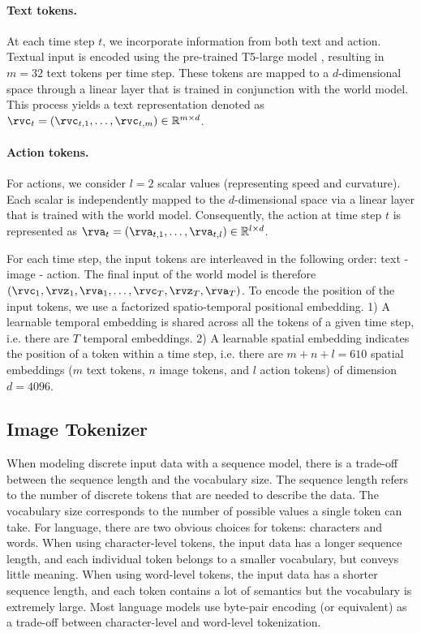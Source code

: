 \paragraph{Text tokens.} At each time step $t$, we incorporate information from both text and action. Textual input is encoded using the pre-trained T5-large model \citep{2020t5}, resulting in $m=32$ text tokens per time step. These tokens are mapped to a $d$-dimensional space through a linear layer that is trained in conjunction with the world model. This process yields a text representation denoted as $\rvc_t = (\rvc_{t,1}, \ldots, \rvc_{t,m}) \in \mathbb{R}^{m\times d}$.

\paragraph{Action tokens.} For actions, we consider $l=2$ scalar values (representing speed and curvature). Each scalar is independently mapped to the $d$-dimensional space via a linear layer that is trained with the world model. Consequently, the action at time step $t$ is represented as $\rva_t = (\rva_{t,1}, \ldots, \rva_{t,l}) \in \mathbb{R}^{l\times d}$. 

For each time step, the input tokens are interleaved in the following order: text - image - action. The final input of the world model is therefore $(\rvc_1,\rvz_1, \rva_1, \ldots, \rvc_T, \rvz_T, \rva_T)$. To encode the position of the input tokens, we use a factorized spatio-temporal positional embedding. 1) A learnable temporal embedding is shared across all the tokens of a given time step, i.e. there are $T$ temporal embeddings. 2) A learnable spatial embedding indicates the position of a token within a time step, i.e. there are $m + n + l = 610$ spatial embeddings ($m$ text tokens, $n$ image tokens, and $l$ action tokens) of dimension $d=4096$. 


\subsection{Image Tokenizer}
\label{subsection:image-tokenizer}
When modeling discrete input data with a sequence model, there is a trade-off between the sequence length and the vocabulary size. The sequence length refers to the number of discrete tokens that are needed to describe the data. The vocabulary size corresponds to the number of possible values a single token can take. For language, there are two obvious choices for tokens: characters and words. When using character-level tokens, the input data has a longer sequence length, and each individual token belongs to a smaller vocabulary, but conveys little meaning. When using word-level tokens, the input data has a shorter sequence length, and each token contains a lot of semantics but the vocabulary is extremely large. Most language models \citep{roberta19,brown20,2020t5,Chowdhery2022PaLMSL,hoffmann22,llama23} use byte-pair encoding (or equivalent) as a trade-off between character-level and word-level tokenization.

